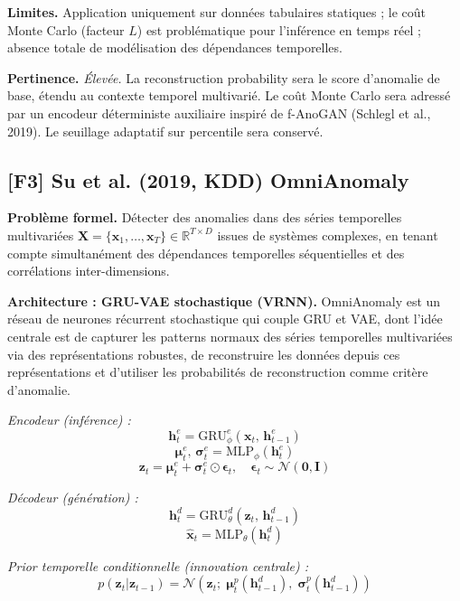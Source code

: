 \documentclass[12pt,a4paper]{article}
\begin{document}
\textbf{Limites.} Application uniquement sur données tabulaires statiques ; le coût Monte Carlo (facteur $L$) est problématique pour l'inférence en temps réel ; absence totale de modélisation des dépendances temporelles.

\textbf{Pertinence.} \textit{Élevée.} La reconstruction probability sera le score d'anomalie de base, étendu au contexte temporel multivarié. Le coût Monte Carlo sera adressé par un encodeur déterministe auxiliaire inspiré de f-AnoGAN (Schlegl et al., 2019). Le seuillage adaptatif sur percentile sera conservé.

\subsection{[F3] Su et al. (2019, KDD)  OmniAnomaly}

\textbf{Problème formel.} Détecter des anomalies dans des séries temporelles multivariées $\mathbf{X} = \{\mathbf{x}_1,\ldots,\mathbf{x}_T\} \in \mathbb{R}^{T \times D}$ issues de systèmes complexes, en tenant compte simultanément des dépendances temporelles séquentielles et des corrélations inter-dimensions.

\textbf{Architecture : GRU-VAE stochastique (VRNN).} OmniAnomaly est un réseau de neurones récurrent stochastique qui couple GRU et VAE, dont l'idée centrale est de capturer les patterns normaux des séries temporelles multivariées via des représentations robustes, de reconstruire les données depuis ces représentations et d'utiliser les probabilités de reconstruction comme critère d'anomalie.

\textit{Encodeur (inférence) :}
$$\mathbf{h}^e_t = \mathrm{GRU}_\phi^e(\mathbf{x}_t,\,\mathbf{h}^e_{t-1})$$
$$\boldsymbol{\mu}^e_t,\,\boldsymbol{\sigma}^e_t = \mathrm{MLP}_\phi(\mathbf{h}^e_t)$$
$$\mathbf{z}_t = \boldsymbol{\mu}^e_t + \boldsymbol{\sigma}^e_t \odot \boldsymbol{\epsilon}_t, \quad \boldsymbol{\epsilon}_t \sim \mathcal{N}(\mathbf{0},\mathbf{I})$$

\textit{Décodeur (génération) :}
$$\mathbf{h}^d_t = \mathrm{GRU}_\theta^d(\mathbf{z}_t,\,\mathbf{h}^d_{t-1})$$
$$\hat{\mathbf{x}}_t = \mathrm{MLP}_\theta(\mathbf{h}^d_t)$$

\textit{Prior temporelle conditionnelle (innovation centrale) :}
$$p(\mathbf{z}_t | \mathbf{z}_{t-1}) = \mathcal{N}\!\left(\mathbf{z}_t;\;\boldsymbol{\mu}^p_t(\mathbf{h}^d_{t-1}),\;\boldsymbol{\sigma}^p_t(\mathbf{h}^d_{t-1})\right)$$
\end{document}
